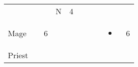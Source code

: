 \documentclass[12pt]{article}
\begin{document}
\begin{longtable}[]{@{}llllllllll@{}}
\begin{minipage}[t]{0.06\columnwidth}
\strut\end{minipage} &
\begin{minipage}[t]{0.06\columnwidth}\raggedright\strut
\strut\end{minipage} &
\begin{minipage}[t]{0.06\columnwidth}\raggedright\strut
\strut\end{minipage} &
\begin{minipage}[t]{0.07\columnwidth}\raggedright\strut
N
\strut\end{minipage} &
\begin{minipage}[t]{0.08\columnwidth}\raggedright\strut
4
\strut\end{minipage}\tabularnewline
\begin{minipage}[t]{0.13\columnwidth}\raggedright\strut
Mage
\strut\end{minipage} &
\begin{minipage}[t]{0.06\columnwidth}\raggedright\strut
\strut\end{minipage} &
\begin{minipage}[t]{0.06\columnwidth}\raggedright\strut
6
\strut\end{minipage} &
\begin{minipage}[t]{0.06\columnwidth}\raggedright\strut
\strut\end{minipage} &
\begin{minipage}[t]{0.06\columnwidth}\raggedright\strut
\strut\end{minipage} &
\begin{minipage}[t]{0.06\columnwidth}\raggedright\strut
\strut\end{minipage} &
\begin{minipage}[t]{0.06\columnwidth}\raggedright\strut
\strut\end{minipage} &
\begin{minipage}[t]{0.06\columnwidth}\raggedright\strut
\strut\end{minipage} &
\begin{minipage}[t]{0.07\columnwidth}\raggedright\strut
\begin{itemize}
\item
\end{itemize}
\strut\end{minipage} &
\begin{minipage}[t]{0.08\columnwidth}\raggedright\strut
6
\strut\end{minipage}\tabularnewline
\begin{minipage}[t]{0.13\columnwidth}\raggedright\strut
Priest
\strut\end{minipage} &

\end{longtable}
\end{document}
